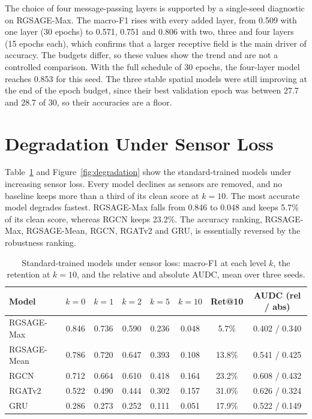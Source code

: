 \documentclass[MTech]{ugthesis}
\begin{document}
The choice of four message-passing layers is supported by a single-seed diagnostic on RGSAGE-Max. The macro-F1 rises with every added layer, from 0.509 with one layer (30 epochs) to 0.571, 0.751 and 0.806 with two, three and four layers (15 epochs each), which confirms that a larger receptive field is the main driver of accuracy. The budgets differ, so these values show the trend and are not a controlled comparison. With the full schedule of 30 epochs, the four-layer model reaches 0.853 for this seed. The three stable spatial models were still improving at the end of the epoch budget, since their best validation epoch was between 27.7 and 28.7 of 30, so their accuracies are a floor.

\section{Degradation Under Sensor Loss}

Table~\ref{tab:degradation} and Figure~\ref{fig:degradation} show the standard-trained models under increasing sensor loss. Every model declines as sensors are removed, and no baseline keeps more than a third of its clean score at $k=10$. The most accurate model degrades fastest. RGSAGE-Max falls from 0.846 to 0.048 and keeps 5.7\% of its clean score, whereas RGCN keeps 23.2\%. The accuracy ranking, RGSAGE-Max, RGSAGE-Mean, RGCN, RGATv2 and GRU, is essentially reversed by the robustness ranking.

\begin{table}[htbp]
\caption{Standard-trained models under sensor loss: macro-F1 at each level $k$, the retention at $k=10$, and the relative and absolute \acs{AUDC}, mean over three seeds.}
\label{tab:degradation}
\small
\centering
\begin{tabular}{@{}lccccccc@{}}
\toprule
Model & $k=0$ & $k=1$ & $k=2$ & $k=5$ & $k=10$ & Ret@10 & AUDC (rel / abs) \\
\midrule
RGSAGE-Max & 0.846 & 0.736 & 0.590 & 0.236 & 0.048 & 5.7\% & 0.402 / 0.340 \\
RGSAGE-Mean & 0.786 & 0.720 & 0.647 & 0.393 & 0.108 & 13.8\% & 0.541 / 0.425 \\
RGCN & 0.712 & 0.664 & 0.610 & 0.418 & 0.164 & 23.2\% & 0.608 / 0.432 \\
RGATv2 & 0.522 & 0.490 & 0.444 & 0.302 & 0.157 & 31.0\% & 0.626 / 0.324 \\
GRU & 0.286 & 0.273 & 0.252 & 0.111 & 0.051 & 17.9\% & 0.522 / 0.149 \\
\bottomrule
\end{tabular}
\end{table}
\end{document}
